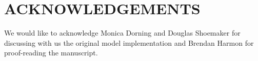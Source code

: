 \documentclass{isprs}
\begin{document}
\section*{ACKNOWLEDGEMENTS}\label{ACKNOWLEDGEMENTS}
We would like to acknowledge Monica Dorning and Douglas Shoemaker
for discussing with us the original model implementation and Brendan Harmon for proof-reading the manuscript.



\end{document}
